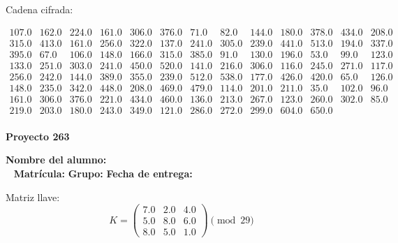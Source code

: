 \documentclass[12pt]{article}
\begin{document}
Cadena cifrada:
\begin{center}
$\begin{array}{lllllllllllll}
107.0 & 162.0 & 224.0 & 161.0 & 306.0 & 376.0 & 71.0 & 82.0 & 144.0 & 180.0 & 378.0 & 434.0 & 208.0\\
315.0 & 413.0 & 161.0 & 256.0 & 322.0 & 137.0 & 241.0 & 305.0 & 239.0 & 441.0 & 513.0 & 194.0 & 337.0\\
395.0 & 67.0 & 106.0 & 148.0 & 166.0 & 315.0 & 385.0 & 91.0 & 130.0 & 196.0 & 53.0 & 99.0 & 123.0\\
133.0 & 251.0 & 303.0 & 241.0 & 450.0 & 520.0 & 141.0 & 216.0 & 306.0 & 116.0 & 245.0 & 271.0 & 117.0\\
256.0 & 242.0 & 144.0 & 389.0 & 355.0 & 239.0 & 512.0 & 538.0 & 177.0 & 426.0 & 420.0 & 65.0 & 126.0\\
148.0 & 235.0 & 342.0 & 448.0 & 208.0 & 469.0 & 479.0 & 114.0 & 201.0 & 211.0 & 35.0 & 102.0 & 96.0\\
161.0 & 306.0 & 376.0 & 221.0 & 434.0 & 460.0 & 136.0 & 213.0 & 267.0 & 123.0 & 260.0 & 302.0 & 85.0\\
219.0 & 203.0 & 180.0 & 243.0 & 349.0 & 121.0 & 286.0 & 272.0 & 299.0 & 604.0 & 650.0\\
\end{array}$
\end{center}

\newpage


\textbf{Proyecto 263}

\textbf{Nombre del alumno:} \underline{\hspace{13cm}}\\\
\vspace{1cm}
\textbf{Matrícula:} \underline{\hspace{4cm}} \hspace{1cm}
\textbf{Grupo:} \underline{\hspace{2cm}}
\textbf{Fecha de entrega:} \underline{\hspace{2cm}}

\medskip

Matriz llave:
\[
K = \begin{pmatrix}
7.0 & 2.0 & 4.0\\
5.0 & 8.0 & 6.0\\
8.0 & 5.0 & 1.0
\end{pmatrix} \pmod{29}
\]
\end{document}

